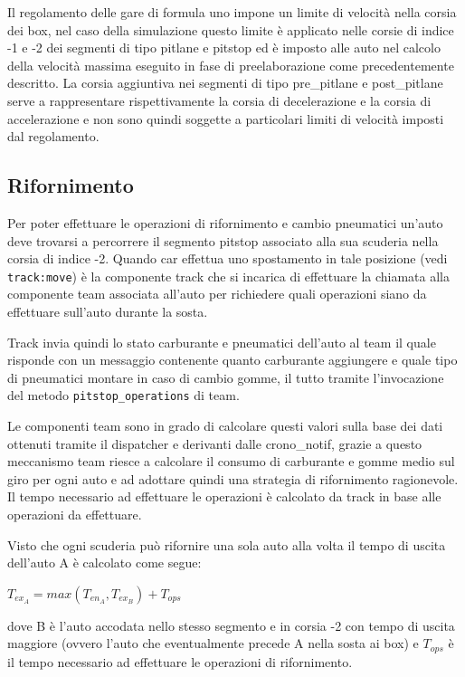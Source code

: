 \documentclass[11pt,a4paper]{report}
\newcommand{\fun}[1]{\texttt{#1}}
\begin{document}
Il regolamento delle gare di formula uno impone un limite di velocità nella corsia dei box, nel caso della simulazione questo limite è applicato nelle corsie di indice -1 e -2 dei segmenti di tipo pitlane e pitstop ed è imposto alle auto nel calcolo della velocità massima eseguito in fase di preelaborazione come precedentemente descritto.
La corsia aggiuntiva nei segmenti di tipo pre\_pitlane e post\_pitlane serve a rappresentare rispettivamente la corsia di decelerazione e la corsia di accelerazione e non sono quindi soggette a particolari limiti di velocità imposti dal regolamento.

\subsection{Rifornimento}
\label{txt:rifornimento}
Per poter effettuare le operazioni di rifornimento e cambio pneumatici un'auto deve trovarsi a percorrere il segmento pitstop associato alla sua scuderia nella corsia di indice -2. Quando car effettua uno spostamento in tale posizione (vedi \fun{track:move}) è la componente track che si incarica di effettuare la chiamata alla componente team associata all'auto per richiedere quali operazioni siano da effettuare sull'auto durante la sosta.

Track invia quindi lo stato carburante e pneumatici dell'auto al team il quale risponde con un messaggio contenente quanto carburante aggiungere e quale tipo di pneumatici montare in caso di cambio gomme, il tutto tramite l'invocazione del metodo \fun{pitstop\_operations} di team.

Le componenti team sono in grado di calcolare questi valori sulla base dei dati ottenuti tramite il dispatcher e derivanti dalle crono\_notif, grazie a questo meccanismo team riesce a calcolare il consumo di carburante e gomme medio sul giro per ogni auto e ad adottare quindi una strategia di rifornimento ragionevole.
Il tempo necessario ad effettuare le operazioni è calcolato da track in base alle operazioni da effettuare.

Visto che ogni scuderia può rifornire una sola auto alla volta il tempo di uscita dell'auto A è calcolato come segue:
\begin{center}
$T_{ex_A} = max(T_{en_A}, T_{ex_B}) + T_{ops}$
\end{center}
dove B è l'auto accodata nello stesso segmento e in corsia -2 con tempo di uscita maggiore (ovvero l'auto che eventualmente precede A nella sosta ai box) e $T_{ops}$ è il tempo necessario ad effettuare le operazioni di rifornimento.
\end{document}
